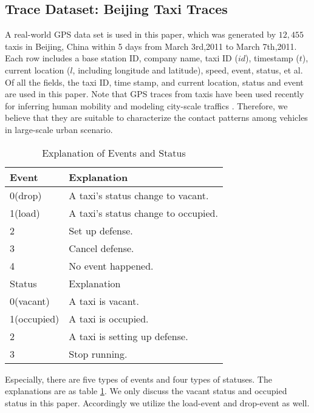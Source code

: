 \subsection{Trace Dataset: Beijing Taxi Traces}
\label{section_trace_data}

A real-world GPS data set is used in this paper, which was generated by $12,455$ taxis in Beijing, China within 5 days from March 3rd,2011 to March 7th,2011.
Each row includes a base station ID, company name, taxi ID ($id$), timestamp ($t$), current location ($l$, including longitude and latitude), speed, event, status, et al. Of all the fields, the taxi ID, time stamp, and current location, status and event are used in this paper. Note that GPS traces from taxis have been used recently for inferring human mobility \cite{Ganti} and modeling city-scale traffics \cite{Aslam}. Therefore, we believe that they are suitable to characterize the contact patterns among vehicles in large-scale urban scenario.

\begin{table}[!h]
\caption{Explanation of Events and Status}\label{table_event_detail}
\centering
\begin{tabular}{l|l}
  \hline
  Event & Explanation \\
  \hline
  0(drop) & A taxi's status change to vacant.\\
  \hline
  1(load) & A taxi's status change to occupied.\\
  \hline
  2 & Set up defense.\\
  \hline
  3 & Cancel defense.\\
  \hline
  4 & No event happened.\\
  \hline
  \hline
  Status & Explanation \\
  \hline
0(vacant) & A taxi is vacant. \\
    \hline
1(occupied) & A taxi is occupied. \\
    \hline
2 & A taxi is setting up defense. \\
    \hline
3 & Stop running.\\
  \hline
\end{tabular}
\end{table}


Especially, there are five types of events and four types of statuses. The explanations are as table \ref{table_event_detail}. We only discuss the vacant status and occupied status in this paper. Accordingly we utilize the load-event and drop-event as well.






